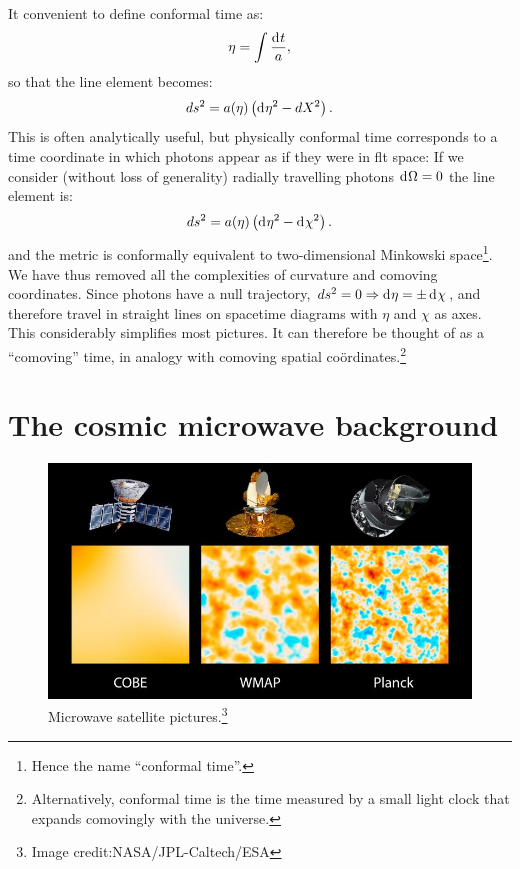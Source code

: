 It convenient to define conformal time as:
\begin{equation}
  \eta = \int \frac{\operatorname{d}^{}\!{t}}{a},
  \label{eqn:cos:conformal_time}
\end{equation}
so that the line element becomes:
\begin{equation}          
  ds^2 = a(\eta)\left( \operatorname{d}^{}\!{\eta}^2 - d{X}^2 \right).
  \label{eqn:cos:flat_FRW}
\end{equation}
This is often analytically useful, but physically conformal time corresponds to a time coordinate in which photons appear as if they were in flt space: If we consider (without loss of generality) radially travelling photons $\operatorname{d}^{}\!{\Omega}=0$ the line element is:
\begin{equation}          
  ds^2 = a(\eta)\left( \operatorname{d}^{}\!{\eta}^2 - \operatorname{d}^{}\!{\chi}^2 \right).
  \label{eqn:cos:flat_FRW_radial}
\end{equation}
and the metric is conformally equivalent to two-dimensional Minkowski space\footnote{Hence the name ``conformal time''.}. We have thus removed all the complexities of curvature and comoving coordinates. Since photons have a null trajectory, $ds^2=0\Rightarrow \operatorname{d}^{}\!{\eta} = \pm \operatorname{d}^{}\!{\chi}$, and therefore  travel in straight lines on spacetime diagrams with $\eta$ and $\chi$ as axes. This considerably simplifies most pictures. It can therefore be thought of as a ``comoving'' time, in analogy with comoving spatial co\"{o}rdinates.\footnote{Alternatively, conformal time is the time measured by a small light clock that expands comovingly with the universe.}

\section{The cosmic microwave background}
\begin{figure}[tp]
  \centering
  \includegraphics[width=\textwidth]{chapters/inflationary_cosmology/figures/satellites}
  \caption{Microwave satellite pictures.\protect\footnote{Image credit:NASA/JPL-Caltech/ESA}}\label{fig:cos:satellites}
\end{figure}

